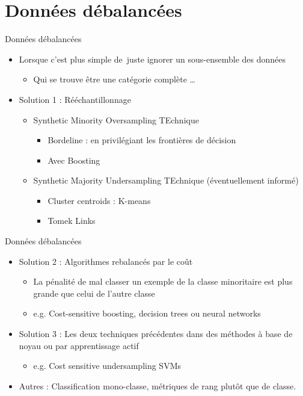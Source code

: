 \documentclass[french]{beamer}
\begin{document}
\section[Unbalanced]{Données débalancées}

\begin{frame}{Données débalancées}
\begin{itemize}
	\item Lorsque c'est plus simple de juste ignorer un sous-ensemble des données
	\begin{itemize}
		\item Qui se trouve être une catégorie complète \ldots
	\end{itemize}
	\item Solution 1 : Rééchantillonnage
	\begin{itemize}
		\item 	Synthetic Minority Oversampling TEchnique
		\begin{itemize}
			\item Bordeline : en privilégiant les frontières de décision
			\item Avec Boosting
		\end{itemize}
		\item Synthetic Majority Undersampling TEchnique (éventuellement informé)
		\begin{itemize}
			\item Cluster centroids : K-means
			\item Tomek Links
		\end{itemize}
	\end{itemize}		
\end{itemize}
\end{frame}

\begin{frame}{Données débalancées}
\begin{itemize}
	\item Solution 2 : Algorithmes rebalancés par le coût
	\begin{itemize}
		\item La pénalité de mal classer un exemple de la classe minoritaire est plus grande que celui de l'autre classe
		\item[] e.g. Cost-sensitive boosting, decision trees ou neural networks
	\end{itemize}
	\item Solution 3 : Les deux techniques précédentes dans des méthodes à base de noyau ou par apprentissage actif
	\begin{itemize}
		\item[] e.g. Cost sensitive undersampling SVMs 
	\end{itemize}
	\item Autres : Classification mono-classe, métriques de rang plutôt que de classe.	
\end{itemize}
\end{frame}
\end{document}
